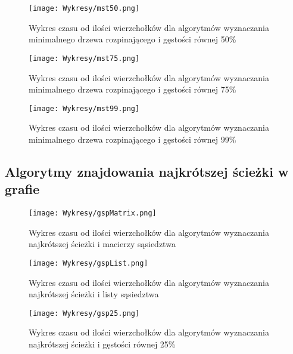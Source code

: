 \documentclass{article}
\begin{document}
            \begin{figure}[H]
                \centering
                \texttt{[image: Wykresy/mst50.png]}
                \caption{Wykres czasu od ilości wierzchołków dla algorytmów wyznaczania minimalnego drzewa rozpinającego i gęstości równej 50\%}
            \end{figure}

            \begin{figure}[H]
                \centering
                \texttt{[image: Wykresy/mst75.png]}
                \caption{Wykres czasu od ilości wierzchołków dla algorytmów wyznaczania minimalnego drzewa rozpinającego i gęstości równej 75\%}
            \end{figure}

            \begin{figure}[H]
                \centering
                \texttt{[image: Wykresy/mst99.png]}
                \caption{Wykres czasu od ilości wierzchołków dla algorytmów wyznaczania minimalnego drzewa rozpinającego i gęstości równej 99\%}
            \end{figure}

        \subsection{Algorytmy znajdowania najkrótszej ścieżki w grafie}

            \begin{figure}[H]
                \centering
                \texttt{[image: Wykresy/gspMatrix.png]}
                \caption{Wykres czasu od ilości wierzchołków dla algorytmów wyznaczania najkrótszej ścieżki i macierzy sąsiedztwa}
            \end{figure}

            \begin{figure}[H]
                \centering
                \texttt{[image: Wykresy/gspList.png]}
                \caption{Wykres czasu od ilości wierzchołków dla algorytmów wyznaczania najkrótszej ścieżki i listy sąsiedztwa}
            \end{figure}

            \begin{figure}[H]
                \centering
                \texttt{[image: Wykresy/gsp25.png]}
                \caption{Wykres czasu od ilości wierzchołków dla algorytmów wyznaczania najkrótszej ścieżki i gęstości równej 25\%}
            \end{figure}
\end{document}
